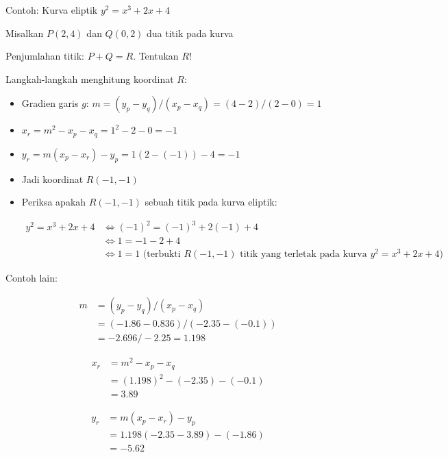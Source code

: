 \documentclass{article}
\begin{document}
\newpage


Contoh: Kurva eliptik $y^2 = x^3 + 2x + 4$

Misalkan $P(2, 4)$ dan $Q(0, 2)$ dua titik pada kurva

Penjumlahan titik: $P + Q = R$. Tentukan $R$!

Langkah-langkah menghitung koordinat $R$:

\begin{itemize}
    \item Gradien garis $g$: $m = (y_p - y_q)/(x_p - x_q) = (4 - 2)/(2 - 0) = 1$
    \item $x_r = m^2 - x_p - x_q = 1^2 - 2 - 0 = -1$
    \item $y_r = m(x_p - x_r) - y_p = 1(2 - (-1)) - 4 = -1$
    \item Jadi koordinat $R(-1, -1)$
    \item Periksa apakah $R(-1, -1)$ sebuah titik pada kurva eliptik:
    
    \begin{align*}
    y^2 = x^3 + 2x + 4 & \Leftrightarrow (-1)^2 = (-1)^3 + 2(-1) + 4 \\
    & \Leftrightarrow 1 = -1 - 2 + 4 \\
    & \Leftrightarrow 1 = 1 \text{ (terbukti } R(-1, -1) \text{ titik yang terletak pada kurva } y^2 = x^3 + 2x + 4)\
    \end{align*}
\end{itemize}

\newpage


\bullet Contoh lain:

\vspace{197.21mm}

\begin{align*}
 m &= (y_p - y_q)/(x_p - x_q) \\
 &= (-1.86 - 0.836)/(-2.35 - (-0.1)) \\
 &= -2.696 / -2.25 = 1.198 
\end{align*}

\begin{align*}
 x_r &= m^2 - x_p - x_q \\
 &= (1.198)^2 - (-2.35) - (-0.1) \\
 &= 3.89 
\end{align*}

\begin{align*}
 y_r &= m(x_p - x_r) - y_p \\
 &= 1.198(-2.35 - 3.89) - (-1.86) \\
 &= -5.62 
\end{align*}
\end{document}
